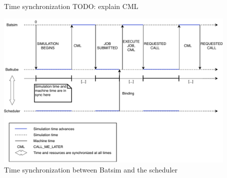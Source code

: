 \documentclass[12pt, aspectratio=43]{beamer}
\begin{document}
%		

\begin{frame}[allowframebreaks]{Time synchronization}
	TODO: explain CML
	\framebreak

	\centering
	\includegraphics[width=0.87\textwidth]{../imgs/lignes_de_temps_simple.pdf}\\
	\small{Time synchronization between Batsim and the scheduler}
\end{frame}
\end{document}
